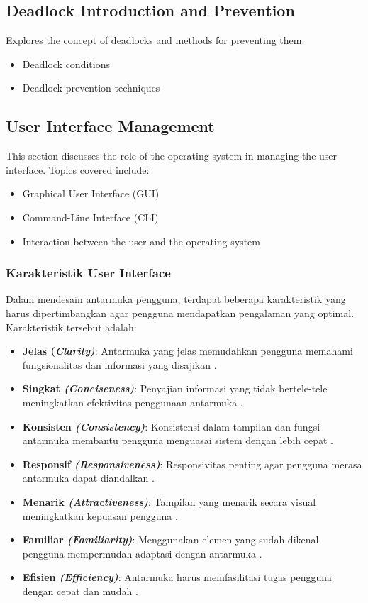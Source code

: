 \documentclass[12pt]{article}
\begin{document}
\subsection{Deadlock Introduction and Prevention}
Explores the concept of deadlocks and methods for preventing them:
\begin{itemize}
    \item Deadlock conditions
    \item Deadlock prevention techniques
\end{itemize}

\subsection{User Interface Management}
This section discusses the role of the operating system in managing the user interface. Topics covered include:
\begin{itemize}
    \item Graphical User Interface (GUI)
    \item Command-Line Interface (CLI)
    \item Interaction between the user and the operating system
\end{itemize}

\subsubsection{Karakteristik User Interface}
Dalam mendesain antarmuka pengguna, terdapat beberapa karakteristik yang harus dipertimbangkan agar pengguna mendapatkan pengalaman yang optimal. Karakteristik tersebut adalah:

\begin{itemize}
    \item \textbf{Jelas (\textit{Clarity)}}: Antarmuka yang jelas memudahkan pengguna memahami fungsionalitas dan informasi yang disajikan \cite{nielsen1995}.
    \item \textbf{Singkat \textit{(Conciseness)}}: Penyajian informasi yang tidak bertele-tele meningkatkan efektivitas penggunaan antarmuka \cite{shneiderman1997}.
    \item \textbf{Konsisten \textit{(Consistency)}}: Konsistensi dalam tampilan dan fungsi antarmuka membantu pengguna menguasai sistem dengan lebih cepat \cite{nielsen2000}.
    \item \textbf{Responsif \textit{(Responsiveness)}}: Responsivitas penting agar pengguna merasa antarmuka dapat diandalkan \cite{holtzblatt2005}.
    \item \textbf{Menarik \textit{(Attractiveness)}}: Tampilan yang menarik secara visual meningkatkan kepuasan pengguna \cite{tractinsky1997}.
    \item \textbf{Familiar \textit{(Familiarity)}}: Menggunakan elemen yang sudah dikenal pengguna mempermudah adaptasi dengan antarmuka \cite{norman1988}.
    \item \textbf{Efisien \textit{(Efficiency)}}: Antarmuka harus memfasilitasi tugas pengguna dengan cepat dan mudah \cite{nielsen1993}.
\end{itemize}
\end{document}
